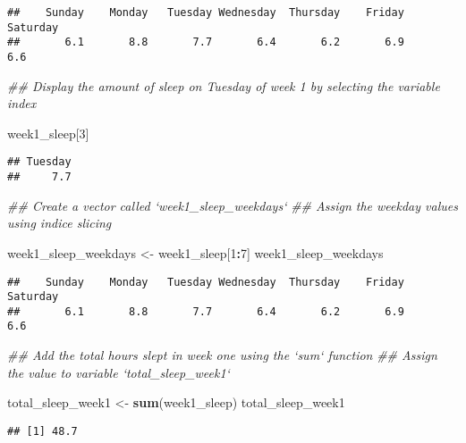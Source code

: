 \documentclass[
]{article}
\newenvironment{Shaded}{\begin{snugshade}}{\end{snugshade}}
\newcommand{\CommentTok}[1]{\textcolor[rgb]{0.56,0.35,0.01}{\textit{#1}}}
\newcommand{\DecValTok}[1]{\textcolor[rgb]{0.00,0.00,0.81}{#1}}
\newcommand{\KeywordTok}[1]{\textcolor[rgb]{0.13,0.29,0.53}{\textbf{#1}}}
\newcommand{\NormalTok}[1]{#1}
\newcommand{\OperatorTok}[1]{\textcolor[rgb]{0.81,0.36,0.00}{\textbf{#1}}}
\newcommand{\StringTok}[1]{\textcolor[rgb]{0.31,0.60,0.02}{#1}}
\begin{document}
\begin{verbatim}
##    Sunday    Monday   Tuesday Wednesday  Thursday    Friday  Saturday 
##       6.1       8.8       7.7       6.4       6.2       6.9       6.6
\end{verbatim}

\begin{Shaded}
\begin{Highlighting}[]
\CommentTok{## Display the amount of sleep on Tuesday of week 1 by selecting the variable index}

\NormalTok{week1_sleep[}\DecValTok{3}\NormalTok{]}
\end{Highlighting}
\end{Shaded}

\begin{verbatim}
## Tuesday 
##     7.7
\end{verbatim}

\begin{Shaded}
\begin{Highlighting}[]
\CommentTok{## Create a vector called `week1_sleep_weekdays`}
\CommentTok{## Assign the weekday values using indice slicing}

\NormalTok{week1_sleep_weekdays <-}\StringTok{ }\NormalTok{week1_sleep[}\DecValTok{1}\OperatorTok{:}\DecValTok{7}\NormalTok{]}
\NormalTok{week1_sleep_weekdays}
\end{Highlighting}
\end{Shaded}

\begin{verbatim}
##    Sunday    Monday   Tuesday Wednesday  Thursday    Friday  Saturday 
##       6.1       8.8       7.7       6.4       6.2       6.9       6.6
\end{verbatim}

\begin{Shaded}
\begin{Highlighting}[]
\CommentTok{## Add the total hours slept in week one using the `sum` function}
\CommentTok{## Assign the value to variable `total_sleep_week1`}

\NormalTok{total_sleep_week1 <-}\StringTok{ }\KeywordTok{sum}\NormalTok{(week1_sleep)}
\NormalTok{total_sleep_week1}
\end{Highlighting}
\end{Shaded}

\begin{verbatim}
## [1] 48.7
\end{verbatim}
\end{document}
